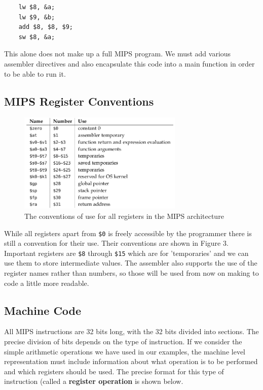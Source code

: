 \documentclass{article}
\begin{document}
	\begin{verbatim}
	lw $8, &a;
	lw $9, &b;
	add $8, $8, $9;
	sw $8, &a;
	\end{verbatim}
	
	This alone does not make up a full MIPS program. We must add various assembler directives and also encapsulate this code into a main function in order to be able to run it.	
		
	\subsection{MIPS Register Conventions}
	
	\begin{figure}[h]
		\centering
		\includegraphics[width=0.7\textwidth]{mips_register_conventions}
		\caption{The conventions of use for all registers in the MIPS architecture}
		\label{fig:mips register conventions}
	\end{figure}
	
	While all registers apart from \texttt{\$0} is freely accessible by the programmer there is still a convention for their use. Their conventions are shown in Figure 3. Important registers are \texttt{\$8} through \texttt{\$15} which are for 'temporaries' and we can use them to store intermediate values. The assembler also supports the use of the register names rather than numbers, so those will be used from now on making to code a little more readable.
	
	
	
	\subsection{Machine Code}
	All MIPS instructions are 32 bits long, with the 32 bits divided into sections. The precise division of bits depends on the type of instruction. If we consider the simple arithmetic operations we have used in our examples, the machine level representation must include information about what operation is to be performed and which registers should be used. The precise format for this type of instruction (called a \textbf{register operation} is shown below.
	
\end{document}
